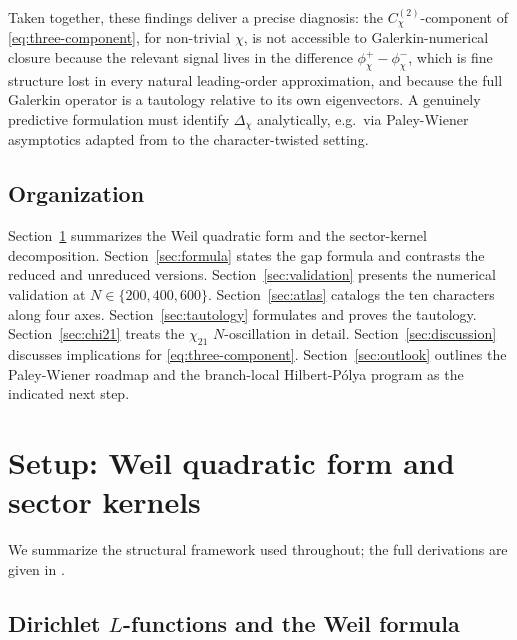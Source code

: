 \documentclass[10pt,twocolumn]{article}
\theoremstyle{definition}
\theoremstyle{remark}
\newcommand{\chifn}{\chi}
\newcommand{\Deltachi}{\Delta_{\chifn}}
\begin{document}
Taken together, these findings deliver a precise diagnosis: the
$C^{(2)}_{\chifn}$-component of \eqref{eq:three-component}, for
non-trivial $\chi$, is not accessible to Galerkin-numerical closure
because the relevant signal lives in the difference
$\phi^+_{\chifn}-\phi^-_{\chifn}$, which is fine structure lost in
every natural leading-order approximation, and because the full
Galerkin operator is a tautology relative to its own eigenvectors.
A genuinely predictive formulation must identify
$\Deltachi$ analytically, e.g.\ via Paley-Wiener asymptotics
adapted from \cite{RH_II} to the character-twisted setting.

\subsection{Organization}

Section~\ref{sec:setup} summarizes the Weil quadratic form and the
sector-kernel decomposition. Section~\ref{sec:formula} states the
gap formula and contrasts the reduced and unreduced versions.
Section~\ref{sec:validation} presents the numerical validation at
$N\in\{200,400,600\}$. Section~\ref{sec:atlas} catalogs the ten
characters along four axes. Section~\ref{sec:tautology} formulates
and proves the tautology. Section~\ref{sec:chi21} treats the
$\chi_{21}$ $N$-oscillation in detail. Section~\ref{sec:discussion}
discusses implications for \eqref{eq:three-component}. Section~\ref{sec:outlook}
outlines the Paley-Wiener roadmap and the branch-local
Hilbert-P\'olya program as the indicated next step.

\section{Setup: Weil quadratic form and sector kernels}
\label{sec:setup}

We summarize the structural framework used throughout; the full
derivations are given in \cite{AnalyticKernel}.

\subsection{\texorpdfstring{Dirichlet $L$-functions}{Dirichlet L-functions} and the Weil formula}
\end{document}
